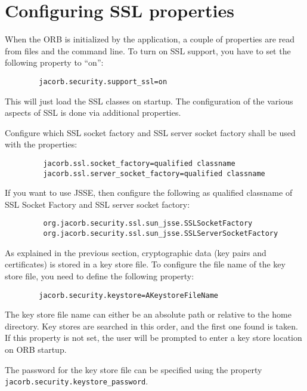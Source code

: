 \section{Configuring SSL properties}

When the ORB is initialized by the application, a couple of properties
are read from files and the  command line. To turn on SSL support, you have to
set the following property to ``on'':

\begin{verbatim}
        jacorb.security.support_ssl=on
\end{verbatim}

This will just load the SSL classes on startup. The configuration of the
various aspects of SSL is done via additional properties.

Configure which SSL socket factory and SSL server socket factory shall
be used with the properties:
\begin{verbatim}
         jacorb.ssl.socket_factory=qualified classname
         jacorb.ssl.server_socket_factory=qualified classname
\end{verbatim}

If you want to use JSSE, then configure the following as qualified
classname of SSL Socket Factory and SSL server socket factory:
\begin{verbatim}
         org.jacorb.security.ssl.sun_jsse.SSLSocketFactory
         org.jacorb.security.ssl.sun_jsse.SSLServerSocketFactory
\end{verbatim}

As explained  in the previous  section, cryptographic data  (key pairs
and  certificates) is  stored in  a  key store  file. To configure the
file name of the key store file, you need to define the following
property:

\begin{verbatim}
        jacorb.security.keystore=AKeystoreFileName
\end{verbatim}

The key store file name can either be an absolute path or relative to
the home directory. Key stores are searched in this order, and the
first one found is taken. If this property is not set, the user will be
prompted to enter a key store location on ORB startup.

The password for the key store file can be specified using the property
{\tt jacorb.security.keystore\_password}.

